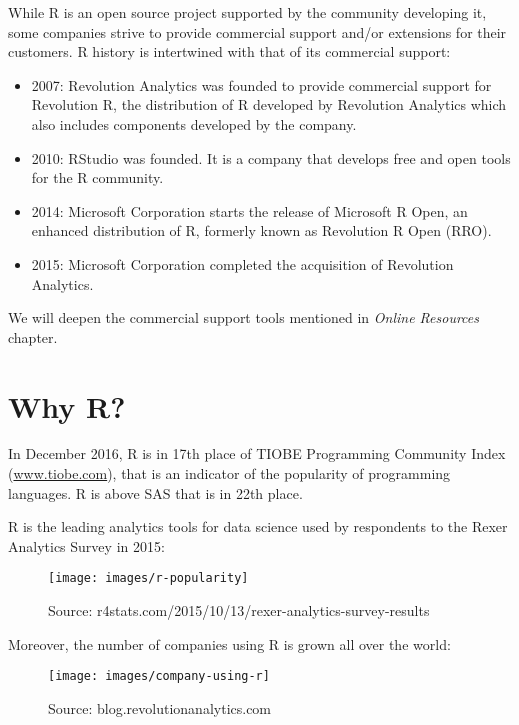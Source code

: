\documentclass[]{book}
\providecommand{\tightlist}{%
  \setlength{\itemsep}{0pt}\setlength{\parskip}{0pt}}
\def\tightlist{}
\begin{document}
While R is an open source project supported by the community developing
it, some companies strive to provide commercial support and/or
extensions for their customers. R history is intertwined with that of
its commercial support:

\begin{itemize}
\tightlist
\item
  2007: Revolution Analytics was founded to provide commercial support
  for Revolution R, the distribution of R developed by Revolution
  Analytics which also includes components developed by the company.
\item
  2010: RStudio was founded. It is a company that develops free and open
  tools for the R community.
\item
  2014: Microsoft Corporation starts the release of Microsoft R Open, an
  enhanced distribution of R, formerly known as Revolution R Open (RRO).
\item
  2015: Microsoft Corporation completed the acquisition of Revolution
  Analytics.
\end{itemize}

We will deepen the commercial support tools mentioned in \emph{Online
Resources} chapter.

\section{Why R?}\label{why-r}

In December 2016, R is in 17th place of TIOBE Programming Community
Index (\href{http://www.tiobe.com/tiobe-index/}{www.tiobe.com}), that is
an indicator of the popularity of programming languages. R is above SAS
that is in 22th place.

R is the leading analytics tools for data science used by respondents to
the Rexer Analytics Survey in 2015:

\begin{figure}

{\centering \texttt{[image: images/r-popularity]} 

}

\caption{Source: r4stats.com/2015/10/13/rexer-analytics-survey-results}\label{fig:g5}
\end{figure}

Moreover, the number of companies using R is grown all over the world:

\begin{figure}

{\centering \texttt{[image: images/company-using-r]} 

}

\caption{Source: blog.revolutionanalytics.com}\label{fig:g6}
\end{figure}
\end{document}
